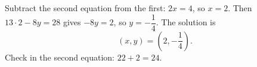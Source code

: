 Subtract the second equation from the first: $2x=4$, so $x=2$. Then $13\cdot2-8y=28$ gives $-8y=2$, so $y=-\dfrac{1}{4}$. The solution is
\[
\boxed{(x,y)=\left(2,-\dfrac{1}{4}\right)}.
\]
Check in the second equation: $22+2=24$.
